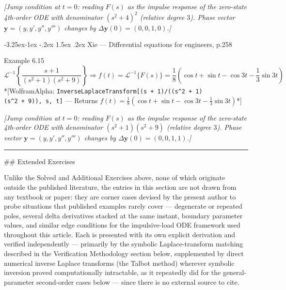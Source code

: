 \documentclass[
  11pt,
]{article}
\makeatletter
\providecommand{\implies}{\Longrightarrow}
\renewcommand\paragraph{\@startsection{paragraph}{4}{\z@}%
                                     {-3.25ex\@plus -1ex \@minus -.2ex}%
                                     {1.5ex \@plus .2ex}%
                                     {\normalfont\normalsize\bfseries}}
\makeatother
\begin{document}
\emph{{[}Jump condition at \(t=0\): reading \(F(s)\) as the impulse
response of the zero-state 4th-order ODE with denominator \((s^2+4)^2\)
(relative degree \(3\)). Phase vector \(\mathbf y=(y,y',y'',y''')\)
changes by \(\Delta\mathbf y(0)=(0,0,1,0)\).{]}}

\hypertarget{xie-differential-equations-for-engineers-p.258-3}{%
\paragraph{Xie --- Differential equations for engineers,
p.258}\label{xie-differential-equations-for-engineers-p.258-3}}

Example 6.15 \[
\mathcal{L}^{-1} \left\{ \frac{s+1}{(s^2+1)(s^2+9)} \right\} \implies f(t) = \mathcal{L}^{-1}\{F(s)\} = \frac{1}{8} \left( \cos t + \sin t - \cos 3t - \frac{1}{3} \sin 3t \right)
\] *{[}WolframAlpha:
\texttt{InverseLaplaceTransform{[}(s\ +\ 1)/((s\^{}2\ +\ 1)(s\^{}2\ +\ 9)),\ s,\ t{]}}
--- Returns
\(f(t) = \frac{1}{8}\left(\cos t + \sin t - \cos 3t - \frac{1}{3}\sin 3t\right)\)*{]}

\emph{{[}Jump condition at \(t=0\): reading \(F(s)\) as the impulse
response of the zero-state 4th-order ODE with denominator
\((s^2+1)(s^2+9)\) (relative degree \(3\)). Phase vector
\(\mathbf y=(y,y',y'',y''')\) changes by
\(\Delta\mathbf y(0)=(0,0,1,1)\).{]}}

\begin{center}\rule{0.5\linewidth}{0.5pt}\end{center}

\#\# Extended Exercises

Unlike the Solved and Additional Exercises above, none of which
originate outside the published literature, the entries in this section
are not drawn from any textbook or paper: they are corner cases devised
by the present author to probe situations that published examples rarely
cover --- degenerate or repeated poles, several delta derivatives
stacked at the same instant, boundary parameter values, and similar edge
conditions for the impulsive-load ODE framework used throughout this
article. Each is presented with its own explicit derivation and verified
independently --- primarily by the symbolic Laplace-transform matching
described in the Verification Methodology section below, supplemented by
direct numerical inverse Laplace transforms (the Talbot method) wherever
symbolic inversion proved computationally intractable, as it repeatedly
did for the general-parameter second-order cases below --- since there
is no external source to cite.
\end{document}
